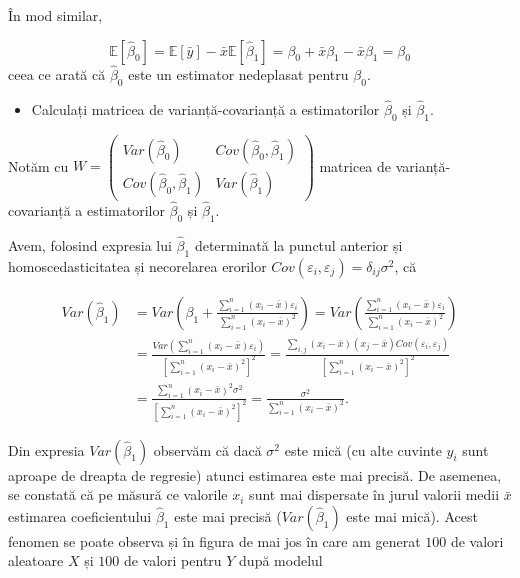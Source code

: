 \documentclass[]{article}
\newenvironment{frshaded*}{%
  \def\FrameCommand{\fboxrule=\FrameRule\fboxsep=\FrameSep \fcolorbox{framecolor}{shadecolor1}}%
  \MakeFramed {\advance\hsize-\width \FrameRestore}}%
{\endMakeFramed}
\newenvironment{rmdblock}[1]
  {\begin{frshaded*}
  \begin{itemize}
  \renewcommand{\labelitemi}{
    \raisebox{-.7\height}[0pt][0pt]{
      {\setkeys{Gin}{width=2em,keepaspectratio}\texttt{[image: images/icons/\#1]}}
    }
  }
  \item
  }
  {
  \end{itemize}
  \end{frshaded*}
  }
\newenvironment{rmdexercise}
  {\begin{rmdblock}{exercise}}
  {\end{rmdblock}}
\begin{document}
În mod similar,

\[
\mathbb{E}[\hat\beta_0] = \mathbb{E}[\bar y] - \bar x\mathbb{E}[\hat\beta_1] = \beta_0 + \bar x\beta_1 - \bar x\beta_1 = \beta_0
\] ceea ce arată că \(\hat\beta_0\) este un estimator nedeplasat pentru
\(\beta_0\).

\begin{rmdexercise}
Calculați matricea de varianță-covarianță a estimatorilor
\(\hat\beta_0\) și \(\hat\beta_1\).
\end{rmdexercise}

Notăm cu
\(W = \begin{pmatrix}Var(\hat \beta_0) & Cov(\hat \beta_0, \hat \beta_1)\\ Cov(\hat \beta_0, \hat \beta_1) & Var(\hat \beta_1)\end{pmatrix}\)
matricea de varianță-covarianță a estimatorilor \(\hat\beta_0\) și
\(\hat\beta_1\).

Avem, folosind expresia lui \(\hat\beta_1\) determinată la punctul
anterior și homoscedasticitatea și necorelarea erorilor
\(Cov(\varepsilon_i, \varepsilon_j) = \delta_{ij}\sigma^2\), că

\begin{align*}
  Var(\hat \beta_1) &= Var\left(\beta_1 + \frac{\sum_{i = 1}^{n}(x_i - \bar x)\varepsilon_i}{\sum_{i = 1}^{n}(x_i - \bar x)^2}\right) = Var\left(\frac{\sum_{i = 1}^{n}(x_i - \bar x)\varepsilon_i}{\sum_{i = 1}^{n}(x_i - \bar x)^2}\right)\\
  &= \frac{Var\left(\sum_{i = 1}^{n}(x_i - \bar x)\varepsilon_i\right)}{\left[\sum_{i = 1}^{n}(x_i - \bar x)^2\right]^2} = \frac{\sum_{i,j}(x_i - \bar x)(x_j - \bar x)Cov(\varepsilon_i, \varepsilon_j)}{\left[\sum_{i = 1}^{n}(x_i - \bar x)^2\right]^2}\\
  &= \frac{\sum_{i = 1}^{n}(x_i - \bar x)^2\sigma^2}{\left[\sum_{i = 1}^{n}(x_i - \bar x)^2\right]^2} = \frac{\sigma^2}{\sum_{i = 1}^{n}(x_i - \bar x)^2}.
\end{align*}

Din expresia \(Var(\hat \beta_1)\) observăm că dacă \(\sigma^2\) este
mică (cu alte cuvinte \(y_i\) sunt aproape de dreapta de regresie)
atunci estimarea este mai precisă. De asemenea, se constată că pe măsură
ce valorile \(x_i\) sunt mai dispersate în jurul valorii medii
\(\bar x\) estimarea coeficientului \(\hat \beta_1\) este mai precisă
(\(Var(\hat \beta_1)\) este mai mică). Acest fenomen se poate observa și
în figura de mai jos în care am generat \(100\) de valori aleatoare
\(X\) și \(100\) de valori pentru \(Y\) după modelul
\end{document}
